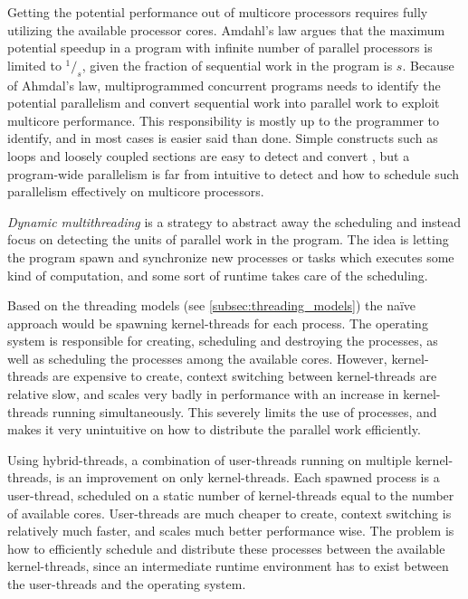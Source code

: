 Getting the potential performance out of multicore processors requires fully utilizing the available processor cores. Amdahl's law \citep{amdahl1967validity} argues that the maximum potential speedup in a program with infinite number of parallel processors is limited to $^1/_s$, given the fraction of sequential work in the program is $s$. Because of Ahmdal's law, multiprogrammed concurrent programs needs to identify the potential parallelism and convert sequential work into parallel work to exploit multicore performance. This responsibility is mostly up to the programmer to identify, and in most cases is easier said than done. Simple constructs such as loops and loosely coupled sections are easy to detect and convert \citep{dagum1998openmp,robison2013composable}, but a program\hyp{}wide parallelism is far from intuitive to detect and how to schedule such parallelism effectively on multicore processors. 

\textit{Dynamic multithreading} is a strategy to abstract away the scheduling and instead focus on detecting the units of parallel work in the program. The idea is letting the program spawn and synchronize new processes or tasks which executes some kind of computation, and some sort of runtime takes care of the scheduling.

Based on the threading models (see \cref{subsec:threading_models}) the naïve approach would be spawning kernel\hyp{}threads for each process. The operating system is responsible for creating, scheduling and destroying the processes, as well as scheduling the processes among the available cores. However, kernel\hyp{}threads are expensive to create, context switching between kernel\hyp{}threads are relative slow, and scales very badly in performance with an increase in kernel\hyp{}threads running simultaneously. This severely limits the use of processes, and makes it very unintuitive on how to distribute the parallel work efficiently.

Using hybrid\hyp{}threads, a combination of user\hyp{}threads running on multiple kernel\hyp{}threads, is an improvement on only kernel\hyp{}threads. Each spawned process is a user\hyp{}thread, scheduled on a static number of kernel\hyp{}threads equal to the number of available cores. User\hyp{}threads are much cheaper to create, context switching is relatively much faster, and scales much better performance wise. The problem is how to efficiently schedule and distribute these processes between the available kernel\hyp{}threads, since an intermediate runtime environment has to exist between the user\hyp{}threads and the operating system.

